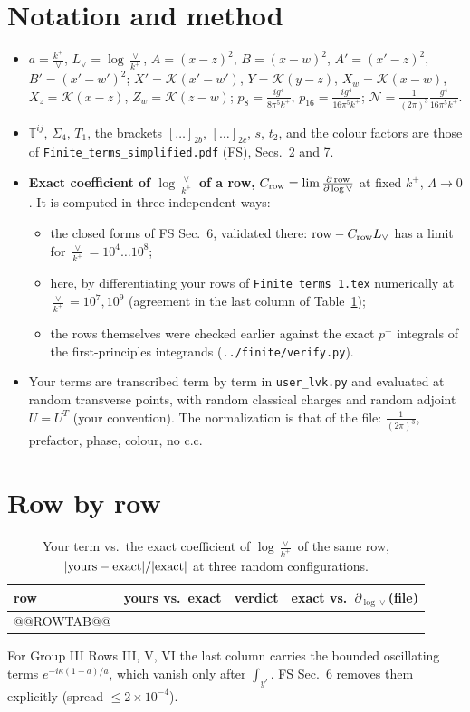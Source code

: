 \documentclass[10pt]{article}
\numberwithin{equation}{section}
\newcommand{\Lv}{L_{\vee}}
\newcommand{\KK}{\mathcal K}
\newcommand{\NN}{\mathcal N}
\newcommand{\pre}{\frac{1}{(2\pi)^3}}
\begin{document}
\section{Notation and method}\label{sec:method}
\begin{itemize}
\item $a=\frac{k^+}{\vee}$, $\Lv=\log\frac{\vee}{k^+}$, $A=(x-z)^2$, $B=(x-w)^2$, $A'=(x'-z)^2$, $B'=(x'-w')^2$; $X'=\KK(x'-w')$, $Y=\KK(y-z)$, $X_w=\KK(x-w)$, $X_z=\KK(x-z)$, $Z_w=\KK(z-w)$; $p_8=\frac{ig^4}{8\pi^5k^+}$, $p_{16}=\frac{ig^4}{16\pi^5k^+}$; $\NN=\pre\frac{g^4}{16\pi^5k^+}$.
\item $\mathbb T^{ij}$, $\Sigma_4$, $T_1$, the brackets $[\dots]_{2b}$, $[\dots]_{2c}$, $s$, $t_2$, and the colour factors are those of \texttt{Finite\_terms\_simplified.pdf} (FS), Secs.~2 and 7.
\item \textbf{Exact coefficient of $\log\frac{\vee}{k^+}$ of a row,} $C_{\rm row}=\lim\frac{\partial\,{\rm row}}{\partial\log\vee}$ at fixed $k^+$, $\Lambda\to0$. It is computed in three independent ways:
\begin{itemize}
\item the closed forms of FS Sec.~6, validated there: ${\rm row}-C_{\rm row}\Lv$ has a limit for $\frac{\vee}{k^+}=10^4\dots10^8$;
\item here, by differentiating your rows of \texttt{Finite\_terms\_1.tex} numerically at $\frac{\vee}{k^+}=10^7,10^9$ (agreement in the last column of Table~\ref{tab:rows});
\item the rows themselves were checked earlier against the exact $p^+$ integrals of the first-principles integrands (\texttt{../finite/verify.py}).
\end{itemize}
\item Your terms are transcribed term by term in \texttt{user\_lvk.py} and evaluated at random transverse points, with random classical charges and random adjoint $U=U^T$ (your convention). The normalization is that of the file: $\pre$, prefactor, phase, colour, no c.c.
\end{itemize}

\section{Row by row}\label{sec:rows}
\begin{table}[H]\centering\small
\caption{Your term vs.\ the exact coefficient of $\log\frac{\vee}{k^+}$ of the same row, $|{\rm yours}-{\rm exact}|/|{\rm exact}|$ at three random configurations.}\label{tab:rows}
\begin{tabular}{@{}llll@{}}\toprule
row & yours vs.\ exact & verdict & exact vs.\ $\partial_{\log\vee}$(file)\\\midrule
@@ROWTAB@@
\bottomrule
\end{tabular}
\end{table}
For Group III Rows III, V, VI the last column carries the bounded oscillating terms $e^{-i\kappa(1-a)/a}$, which vanish only after $\int_{y'}$. FS Sec.~6 removes them explicitly (spread $\le2\times10^{-4}$).
\end{document}
